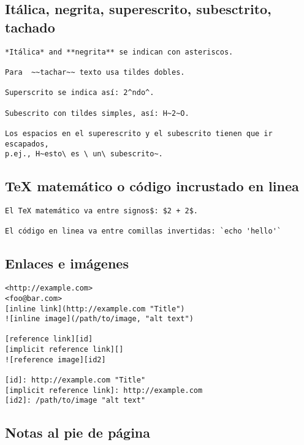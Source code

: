 \documentclass[12pt,spanish,]{article}
\begin{document}
\subsection{Itálica, negrita, superescrito, subesctrito,
tachado}\label{ituxe1lica-negrita-superescrito-subesctrito-tachado}

\begin{verbatim}
*Itálica* and **negrita** se indican con asteriscos.

Para  ~~tachar~~ texto usa tildes dobles.

Superscrito se indica así: 2^ndo^.

Subescrito con tildes simples, así: H~2~O.

Los espacios en el superescrito y el subescrito tienen que ir escapados,
p.ej., H~esto\ es \ un\ subescrito~.
\end{verbatim}

\subsection{TeX matemático o código incrustado en
linea}\label{tex-matemuxe1tico-o-cuxf3digo-incrustado-en-linea}

\begin{verbatim}
El TeX matemático va entre signos$: $2 + 2$.

El código en linea va entre comillas invertidas: `echo 'hello'`
\end{verbatim}

\subsection{Enlaces e imágenes}\label{enlaces-e-imuxe1genes}

\begin{verbatim}
<http://example.com>
<foo@bar.com>
[inline link](http://example.com "Title")
![inline image](/path/to/image, "alt text")

[reference link][id]
[implicit reference link][]
![reference image][id2]

[id]: http://example.com "Title"
[implicit reference link]: http://example.com
[id2]: /path/to/image "alt text"
\end{verbatim}

\subsection{Notas al pie de página}\label{notas-al-pie-de-puxe1gina}
\end{document}
